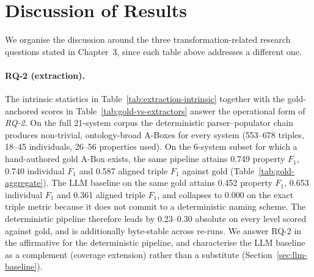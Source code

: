\section{Discussion of Results}\label{sec:transformation-discussion}

We organise the discussion around the three transformation-related
research questions stated in Chapter~3, since each table above
addresses a different one.

\paragraph{RQ-2 (extraction).}
The intrinsic statistics in Table~\ref{tab:extraction-intrinsic}
together with the gold-anchored scores in
Table~\ref{tab:gold-vs-extractors} answer the operational form of
\textit{RQ-2}. On the full 21-system corpus the deterministic
parser--populator chain produces non-trivial, ontology-broad A-Boxes
for every system (553--678 triples, 18--45 individuals, 26--56
properties used). On the 6-system subset for which a hand-authored
gold A-Box exists, the same pipeline attains 0.749 property $F_1$,
0.740 individual $F_1$ and 0.587 aligned triple $F_1$ against gold
(Table~\ref{tab:gold-aggregate}). The LLM baseline on the same gold
attains 0.452 property $F_1$, 0.653 individual $F_1$ and 0.361
aligned triple $F_1$, and collapses to 0.000 on the exact triple
metric because it does not commit to a deterministic naming scheme.
The deterministic pipeline therefore leads by 0.23--0.30 absolute on
every level scored against gold, and is additionally byte-stable
across re-runs. We answer RQ-2 in the affirmative for the
deterministic pipeline, and characterise the LLM baseline as a
complement (coverage extension) rather than a substitute
(Section~\ref{sec:llm-baseline}).

